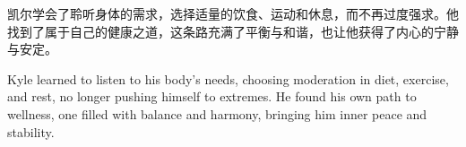 凯尔学会了聆听身体的需求，选择适量的饮食、运动和休息，而不再过度强求。他找到了属于自己的健康之道，这条路充满了平衡与和谐，也让他获得了内心的宁静与安定。

\begin{flushright}
Kyle learned to listen to his body’s needs, choosing moderation in diet, exercise, and rest, no longer pushing himself to extremes. He found his own path to wellness, one filled with balance and harmony, bringing him inner peace and stability.
\end{flushright}